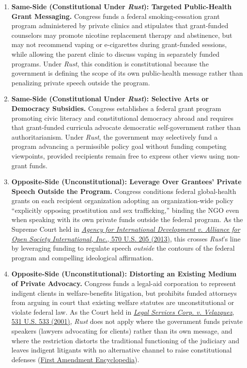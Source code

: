 \documentclass[12pt]{article}
\begin{document}
\begin{enumerate}
\item \textbf{Same-Side (Constitutional Under \textit{Rust}): Targeted Public-Health Grant Messaging.} Congress funds a federal smoking-cessation grant program administered by private clinics and stipulates that grant-funded counselors may promote nicotine replacement therapy and abstinence, but may not recommend vaping or e-cigarettes during grant-funded sessions, while allowing the parent clinic to discuss vaping in separately funded programs. Under \textit{Rust}, this condition is constitutional because the government is defining the scope of its own public-health message rather than penalizing private speech outside the program.
\item \textbf{Same-Side (Constitutional Under \textit{Rust}): Selective Arts or Democracy Subsidies.} Congress establishes a federal grant program promoting civic literacy and constitutional democracy abroad and requires that grant-funded curricula advocate democratic self-government rather than authoritarianism. Under \textit{Rust}, the government may selectively fund a program advancing a permissible policy goal without funding competing viewpoints, provided recipients remain free to express other views using non-grant funds.
\item \textbf{Opposite-Side (Unconstitutional): Leverage Over Grantees' Private Speech Outside the Program.} Congress conditions federal global-health grants on each recipient organization adopting an organization-wide policy ``explicitly opposing prostitution and sex trafficking,'' binding the NGO even when speaking with its own private funds outside the federal program. As the Supreme Court held in \href{https://supreme.justia.com/cases/federal/us/570/205/}{\textit{Agency for International Development v. Alliance for Open Society International, Inc.}, 570 U.S. 205 (2013)}, this crosses \textit{Rust}'s line by leveraging funding to regulate speech \textit{outside} the contours of the federal program and compelling ideological affirmation.
\item \textbf{Opposite-Side (Unconstitutional): Distorting an Existing Medium of Private Advocacy.} Congress funds a legal-aid corporation to represent indigent clients in welfare-benefits litigation, but prohibits funded attorneys from arguing in court that existing welfare statutes are unconstitutional or violate federal law. As the Court held in \href{https://supreme.justia.com/cases/federal/us/531/533/}{\textit{Legal Services Corp. v. Velazquez}, 531 U.S. 533 (2001)}, \textit{Rust} does not apply where the government funds private speakers (lawyers advocating for clients) rather than its own message, and where the restriction distorts the traditional functioning of the judiciary and leaves indigent litigants with no alternative channel to raise constitutional defenses (\href{https://firstamendment.mtsu.edu/article/legal-services-corp-v-velazquez/}{First Amendment Encyclopedia}).

\end{enumerate}
\end{document}
